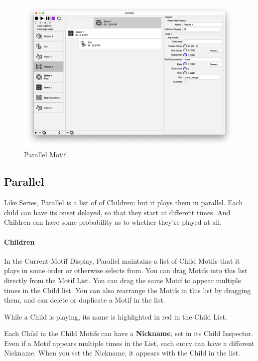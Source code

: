 \documentclass[twoside,10pt]{article}
\begin{document}
\begin{figure}[t]
\centering
\includegraphics[width=6.5in]{Parallel}
\vspace{-2em}
\caption{Parallel Motif.}
\label{parallel}
\end{figure}

\subsection{Parallel}

Like Series, Parallel is a list of of Children; but it plays them in parallel.  Each child can have its onset delayed, so that they start at different times.  And Children can have some probability as to whether they're played at all.

\paragraph{Children}

In the Current Motif Display, Parallel maintains a list of Child Motifs that it plays in some order or otherwise selects from.  You can drag Motifs into this list directly from the Motif List.  You can drag the same Motif to appear multiple times in the Child list.  You can also rearrange the Motifs in this list by dragging them, and can delete or duplicate a Motif in the list.

While a Child is playing, its name is highlighted in red in the Child List.

Each Child in the Child Motifs can have a {\bf Nickname}, set in its Child Inspector.  Even if a Motif appears multiple times in the List, each entry can have a different Nickname.  When you set the Nickname, it appears with the Child in the list.
\end{document}
